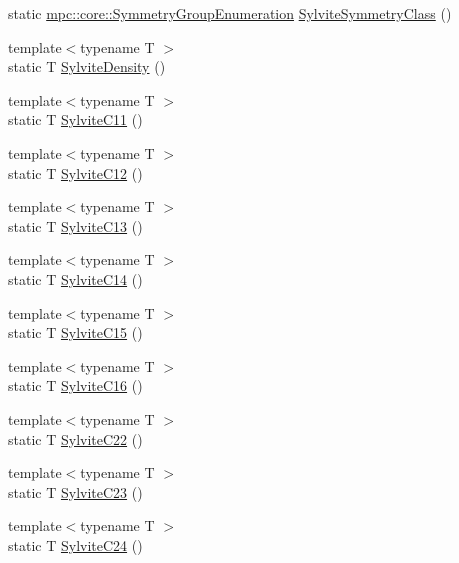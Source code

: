 \begin{DoxyCompactItemize}
\item 
static \mbox{\hyperlink{namespacempc_1_1core_a9d979684062547055a0ef5c13077bad8}{mpc\+::core\+::\+Symmetry\+Group\+Enumeration}} \mbox{\hyperlink{namespacempc_1_1data_a707031ee6f60f85990bd1a8bbc0eb70b}{Sylvite\+Symmetry\+Class}} ()
\item 
{\footnotesize template$<$typename T $>$ }\\static T \mbox{\hyperlink{namespacempc_1_1data_a93d6b463cae170d0b581901e90f8b63b}{Sylvite\+Density}} ()
\item 
{\footnotesize template$<$typename T $>$ }\\static T \mbox{\hyperlink{namespacempc_1_1data_a9a03a8f274be78f02f9a7cf6c386018d}{Sylvite\+C11}} ()
\item 
{\footnotesize template$<$typename T $>$ }\\static T \mbox{\hyperlink{namespacempc_1_1data_a9bf1775beb22532a96bd054751f2e561}{Sylvite\+C12}} ()
\item 
{\footnotesize template$<$typename T $>$ }\\static T \mbox{\hyperlink{namespacempc_1_1data_a08c4e82a11e585d47d341aa5ddd3dddd}{Sylvite\+C13}} ()
\item 
{\footnotesize template$<$typename T $>$ }\\static T \mbox{\hyperlink{namespacempc_1_1data_a2dc88352856e604c3b57eaba96f39365}{Sylvite\+C14}} ()
\item 
{\footnotesize template$<$typename T $>$ }\\static T \mbox{\hyperlink{namespacempc_1_1data_a1de255b4e2e27b705c03c4ef1e66a00c}{Sylvite\+C15}} ()
\item 
{\footnotesize template$<$typename T $>$ }\\static T \mbox{\hyperlink{namespacempc_1_1data_abf4e46aaa20d02f8799134c42101ef41}{Sylvite\+C16}} ()
\item 
{\footnotesize template$<$typename T $>$ }\\static T \mbox{\hyperlink{namespacempc_1_1data_ac6ff9f0173c5719b2b12930525016c12}{Sylvite\+C22}} ()
\item 
{\footnotesize template$<$typename T $>$ }\\static T \mbox{\hyperlink{namespacempc_1_1data_a91f158b5fd7e2557b0b49cd3884fa2e3}{Sylvite\+C23}} ()
\item 
{\footnotesize template$<$typename T $>$ }\\static T \mbox{\hyperlink{namespacempc_1_1data_a8a20fb0a929243aa012c53c7cb85ae01}{Sylvite\+C24}} ()
\item 

\end{DoxyCompactItemize}
